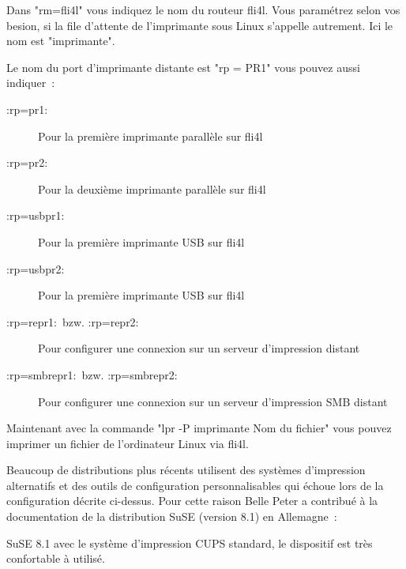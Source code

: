    Dans "rm=fli4l" vous indiquez le nom du routeur fli4l. Vous paramétrez selon
    vos besion, si la file d'attente de l'imprimante sous Linux s'appelle autrement.
    Ici le nom est "imprimante".

    Le nom du port d'imprimante distante est "rp = PR1" vous pouvez aussi indiquer~:

    \begin{description}
    \item[:rp=pr1:\ ] Pour la première imprimante parallèle sur fli4l
    \item[:rp=pr2:\ ] Pour la deuxième imprimante parallèle sur fli4l

    \item[:rp=usbpr1:\ ] Pour la première imprimante USB sur fli4l
    \item[:rp=usbpr2:\ ] Pour la première imprimante USB sur fli4l

    \item[:rp=repr1:\ bzw. :rp=repr2:\ ] Pour configurer une connexion sur un
    serveur d'impression distant

    \item[:rp=smbrepr1:\ bzw. :rp=smbrepr2:\ ] Pour configurer une connexion sur
    un serveur d'impression SMB distant

    \end{description}


    Maintenant avec la commande "lpr -P imprimante Nom du fichier" vous pouvez
    imprimer un fichier de l'ordinateur Linux via fli4l.

Beaucoup de distributions plus récents utilisent des systèmes d'impression
alternatifs et des outils de configuration personnalisables qui échoue lors
de la configuration décrite ci-dessus. Pour cette raison Belle Peter a contribué
à la documentation de la distribution SuSE (version 8.1) en Allemagne~:

SuSE 8.1 avec le système d'impression CUPS standard, le dispositif est très
confortable à utilisé.

